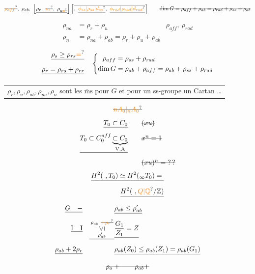 \[
\deleted{\unsure{\rho_{aff}}},\ \underline{\rho_{ab}},\
\left\lfloor\underline{\rho_r,\ \deleted{\unsure{\rho_s}},\ \rho_{u\deleted{\unsure{a}}}}\right\rfloor
\left\lceil\overline{,\ \underline{\unsure{\phi_{ss}|\rho_{ss}|d_{ss}}},\ \underline{\unsure{\phi_{rad}|\rho_{rad}|d_{rad}}}}\right\rceil
\qquad
\deleted{\dim G=\rho_{aff}+\rho_{ab}=\underline{\rho_{rad}}+\rho_{ss}+\rho_{ab}}
\]

\[
\begin{aligned}
\rho_{na}&=\rho_r+\rho_u & \underline{\rho_{aff}},\ \rho_{rad}\\
\rho_n&=\rho_{na}+\rho_{ab}=\rho_r+\rho_u+\rho_{ab}
\end{aligned}
\]

\[
\begin{aligned}
\deleted{\rho_s\geq\rho_{rs}\unsure{=}}&\\
\deleted{\rho_r=\rho_{rs}+\rho_{rr}}&
\end{aligned}
\quad
\left\{\begin{aligned}
\rho_{aff}&=\rho_{ss}+\rho_{rad}\\
\dim G&=\rho_{ab}+\rho_{aff}=\rho_{ab}+\rho_{ss}+\rho_{rad}
\end{aligned}\right.
\]

\noindent\begin{tabular}{@{}|p{.94\linewidth}@{}}
$\rho_r,\rho_u,\rho_{ab},\rho_{na},\rho_n$ sont les $\overline{\mathrm m}\mathrm{s}$ pour $G$ et pour un ss-groupe \unsure{contenant} un Cartan \ldots
\end{tabular}
\[
\deleted{\unsure{n A_0|{}_n A_0}}
\]
\[
\begin{aligned}
\deleted{T_0\subset C_0} &\qquad \deleted{(x u)}\\
\deleted{T_0\subset C_0^{aff}\underbrace{\subset C_0}_{\mathrm{V.A}}} &\qquad \deleted{x^n=1}\\
&\qquad\deleted{(xu)^n={}?\,?}
\end{aligned}
\]
\[
\begin{aligned}
\deleted{H^2(\ ,T_0)\simeq H^2({}_{\infty}T_0)={}}\\
\deleted{H^2(\ ,\unsure{Q|\mathbb{Q}}/\mathbb{Z})}
\end{aligned}
\]
\[
\begin{aligned}
\deleted{G\quad -} &&& \deleted{\rho_{ab}\leq\rho'_{ab}}\\
\deleted{\mathrm{I}\quad\mathrm{I}} &&\deleted{\begin{smallmatrix}\rho_{ab}\ \deleted{\unsure{+\rho_r}}\\ \rotatebox{90}{$\leq$}\\ \rho'_{ab}\end{smallmatrix}}&
\deleted{\frac{G_1}{Z_1}=Z}\\
\deleted{\rho_{ab}+2\rho_r} &&&\deleted{\rho_{ab}(Z_0)\leq\rho_{ab}(Z_1)=\rho_{ab}(G_1)}
\end{aligned}
\]
\[
\deleted{\rho_a+\qquad\rho_{ab}+}
\]

